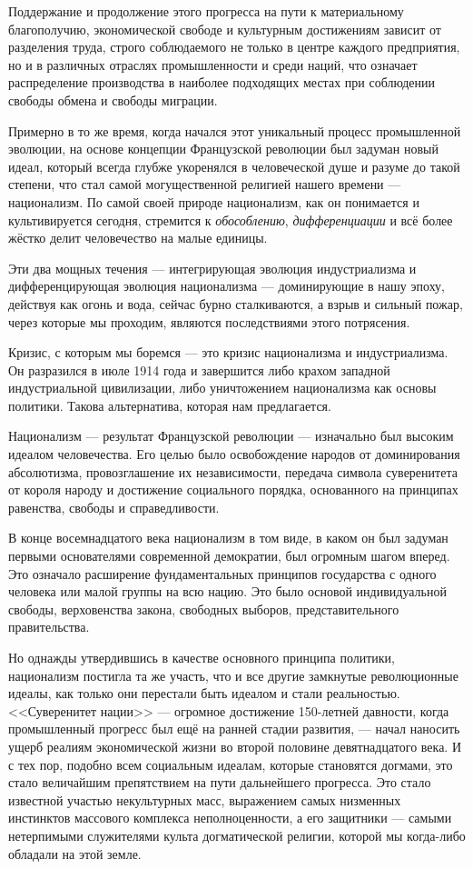 Поддержание и продолжение этого прогресса на пути к материальному благополучию, экономической свободе и культурным достижениям зависит от разделения труда, строго соблюдаемого не только в центре каждого предприятия, но и в различных отраслях промышленности и среди наций, что означает распределение производства в наиболее подходящих местах при соблюдении свободы обмена и свободы миграции.

Примерно в то же время, когда начался этот уникальный процесс промышленной эволюции, на основе концепции Французской революции был задуман новый идеал, который всегда глубже укоренялся в человеческой душе и разуме до такой степени, что стал самой могущественной религией нашего времени — национализм. По самой своей природе национализм, как он понимается и культивируется сегодня, стремится к \textit{обособлению}, \textit{дифференциации} и всё более жёстко делит человечество на малые единицы.

Эти два мощных течения — интегрирующая эволюция индустриализма и дифференцирующая эволюция национализма — доминирующие в нашу эпоху, действуя как огонь и вода, сейчас бурно сталкиваются, а взрыв и сильный пожар, через которые мы проходим, являются последствиями этого потрясения.

Кризис, с которым мы боремся — это кризис национализма и индустриализма. Он разразился в июле 1914 года и завершится либо крахом западной индустриальной цивилизации, либо уничтожением национализма как основы политики. Такова альтернатива, которая нам предлагается.

Национализм — результат Французской революции — изначально был высоким идеалом человечества. Его целью было освобождение народов от доминирования абсолютизма, провозглашение их независимости, передача символа суверенитета от короля народу и достижение социального порядка, основанного на принципах равенства, свободы и справедливости.

В конце восемнадцатого века национализм в том виде, в каком он был задуман первыми основателями современной демократии, был огромным шагом вперед. Это означало расширение фундаментальных принципов государства с одного человека или малой группы на всю нацию. Это было основой индивидуальной свободы, верховенства закона, свободных выборов, представительного правительства.

Но однажды утвердившись в качестве основного принципа политики, национализм постигла та же участь, что и все другие замкнутые революционные идеалы, как только они перестали быть идеалом и стали реальностью. <<Суверенитет нации>> — огромное достижение 150-летней давности, когда промышленный прогресс был ещё на ранней стадии развития, — начал наносить ущерб реалиям экономической жизни во второй половине девятнадцатого века. И с тех пор, подобно всем социальным идеалам, которые становятся догмами, это стало величайшим препятствием на пути дальнейшего прогресса. Это стало известной участью некультурных масс, выражением самых низменных инстинктов массового комплекса неполноценности, а его защитники — самыми нетерпимыми служителями культа догматической религии, которой мы когда-либо обладали на этой земле.

